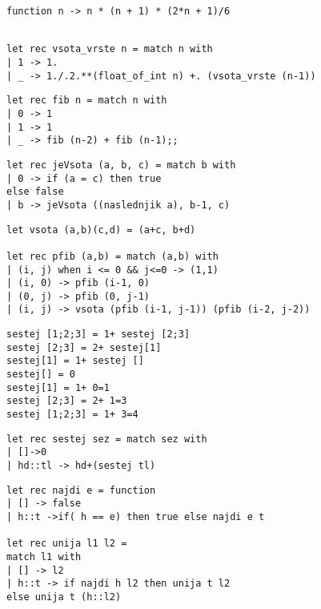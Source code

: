 \begin{Odgovor}{2.1}
\begin{lstlisting}
function n -> n * (n + 1) * (2*n + 1)/6
\end{lstlisting}
\end{Odgovor}
\begin{Odgovor}{2.2}
\begin{lstlisting}

let rec vsota_vrste n = match n with
| 1 -> 1.
| _ -> 1./.2.**(float_of_int n) +. (vsota_vrste (n-1))
\end{lstlisting}
\end{Odgovor}
\begin{Odgovor}{2.3}
\begin{lstlisting}
let rec fib n = match n with
| 0 -> 1
| 1 -> 1
| _ -> fib (n-2) + fib (n-1);;
\end{lstlisting}
\end{Odgovor}
\begin{Odgovor}{2.4}
\begin{lstlisting}
let rec jeVsota (a, b, c) = match b with
| 0 -> if (a = c) then true
else false
| b -> jeVsota ((naslednjik a), b-1, c)
\end{lstlisting}
\end{Odgovor}
\begin{Odgovor}{2.5}
\begin{lstlisting}
let vsota (a,b)(c,d) = (a+c, b+d)

let rec pfib (a,b) = match (a,b) with
| (i, j) when i <= 0 && j<=0 -> (1,1)
| (i, 0) -> pfib (i-1, 0)
| (0, j) -> pfib (0, j-1)
| (i, j) -> vsota (pfib (i-1, j-1)) (pfib (i-2, j-2))
\end{lstlisting}
\end{Odgovor}
\begin{Odgovor}{2.7}
\begin{lstlisting}
sestej [1;2;3] = 1+ sestej [2;3]
sestej [2;3] = 2+ sestej[1]
sestej[1] = 1+ sestej []
sestej[] = 0
sestej[1] = 1+ 0=1
sestej [2;3] = 2+ 1=3
sestej [1;2;3] = 1+ 3=4
\end{lstlisting}
\end{Odgovor}
\begin{Odgovor}{2.8}
\begin{lstlisting}
let rec sestej sez = match sez with
| []->0
| hd::tl -> hd+(sestej tl)
\end{lstlisting}
\end{Odgovor}
\begin{Odgovor}{2.9}
\begin{lstlisting}
let rec najdi e = function
| [] -> false
| h::t ->if( h == e) then true else najdi e t

let rec unija l1 l2 =
match l1 with
| [] -> l2
| h::t -> if najdi h l2 then unija t l2
else unija t (h::l2)
\end{lstlisting}
\end{Odgovor}
